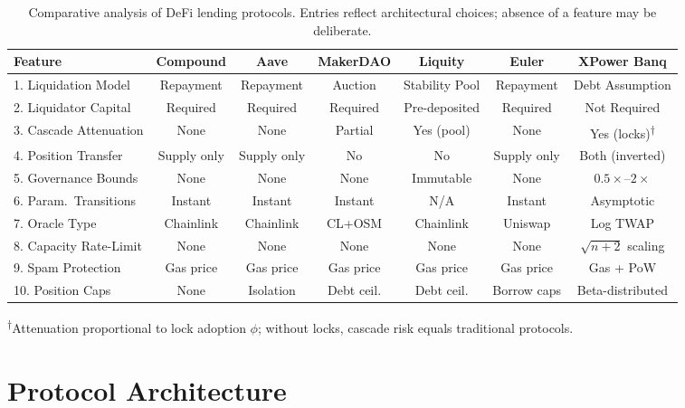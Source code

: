 \documentclass[10pt,a4paper,twocolumn]{article}
\theoremstyle{definition}
\theoremstyle{plain}
\theoremstyle{remark}
\begin{document}
\begin{table}[htbp]
\centering
\caption{Comparative analysis of DeFi lending protocols. Entries reflect architectural choices; absence of a feature may be deliberate.}
\label{tab:protocol-comparison}
\small
\begin{tabular}{@{}lcccccc@{}}
\toprule
Feature & Compound & Aave & MakerDAO & Liquity & Euler & \textbf{XPower Banq} \\
\midrule
1. Liquidation Model & Repayment & Repayment & Auction & Stability Pool & Repayment & Debt Assumption \\
2. Liquidator Capital & Required & Required & Required & Pre-deposited & Required & Not Required \\
3. Cascade Attenuation & None & None & Partial & Yes (pool) & None & Yes (locks)\textsuperscript{$\dagger$} \\
4. Position Transfer & Supply only & Supply only & No & No & Supply only & Both (inverted) \\
5. Governance Bounds & None & None & None & Immutable & None & $0.5\times$--$2\times$ \\
6. Param.\ Transitions & Instant & Instant & Instant & N/A & Instant & Asymptotic \\
7. Oracle Type & Chainlink & Chainlink & CL+OSM & Chainlink & Uniswap & Log TWAP \\
8. Capacity Rate-Limit & None & None & None & None & None & $\sqrt{n{+}2}$ scaling \\
9. Spam Protection & Gas price & Gas price & Gas price & Gas price & Gas price & Gas + PoW \\
10. Position Caps & None & Isolation & Debt ceil. & Debt ceil. & Borrow caps & Beta-distributed \\
\bottomrule
\end{tabular}
\vspace{0.3em}
\par\raggedright\scriptsize\textsuperscript{$\dagger$}Attenuation proportional to lock adoption $\phi$; without locks, cascade risk equals traditional protocols.
\end{table}

\section{Protocol Architecture}
\label{sec:architecture}
\end{document}
